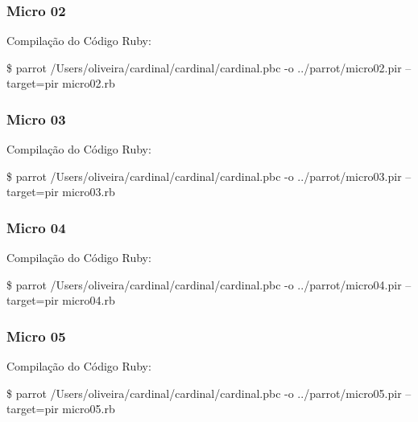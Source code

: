 \documentclass[12pt,a4paper,twoside]{report}
\begin{document}
\subsubsection{Micro 02}


Compilação do Código Ruby:
\begin{terminal}
\$ parrot /Users/oliveira/cardinal/cardinal/cardinal.pbc -o
../parrot/micro02.pir --target=pir micro02.rb
\end{terminal}


\subsubsection{Micro 03}


Compilação do Código Ruby:
\begin{terminal}
\$ parrot /Users/oliveira/cardinal/cardinal/cardinal.pbc -o
../parrot/micro03.pir --target=pir micro03.rb
\end{terminal}


\subsubsection{Micro 04}


Compilação do Código Ruby:
\begin{terminal}
\$ parrot /Users/oliveira/cardinal/cardinal/cardinal.pbc -o
../parrot/micro04.pir --target=pir micro04.rb
\end{terminal}


\subsubsection{Micro 05}


Compilação do Código Ruby:
\begin{terminal}
\$ parrot /Users/oliveira/cardinal/cardinal/cardinal.pbc -o
../parrot/micro05.pir --target=pir micro05.rb
\end{terminal}

\end{document}
